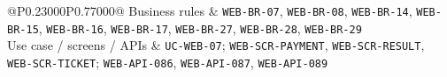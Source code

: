 \begin{longtable}{@{}P{0.23000\SRSWidth}P{0.77000\SRSWidth}@{}}
Business rules & \texttt{WEB-\allowbreak{}BR-\allowbreak{}07}, \texttt{WEB-\allowbreak{}BR-\allowbreak{}08}, \texttt{WEB-\allowbreak{}BR-\allowbreak{}14}, \texttt{WEB-\allowbreak{}BR-\allowbreak{}15}, \texttt{WEB-\allowbreak{}BR-\allowbreak{}16}, \texttt{WEB-\allowbreak{}BR-\allowbreak{}17}, \texttt{WEB-\allowbreak{}BR-\allowbreak{}27}, \texttt{WEB-\allowbreak{}BR-\allowbreak{}28}, \texttt{WEB-\allowbreak{}BR-\allowbreak{}29} \\[3pt]
Use case /\allowbreak{} screens /\allowbreak{} APIs & \texttt{UC-\allowbreak{}WEB-\allowbreak{}07}; \texttt{WEB-\allowbreak{}SCR-\allowbreak{}PAYMENT}, \texttt{WEB-\allowbreak{}SCR-\allowbreak{}RESULT}, \texttt{WEB-\allowbreak{}SCR-\allowbreak{}TICKET}; \texttt{WEB-\allowbreak{}API-\allowbreak{}086}, \texttt{WEB-\allowbreak{}API-\allowbreak{}087}, \texttt{WEB-\allowbreak{}API-\allowbreak{}089} \\[3pt]
\end{longtable}
\endgroup


